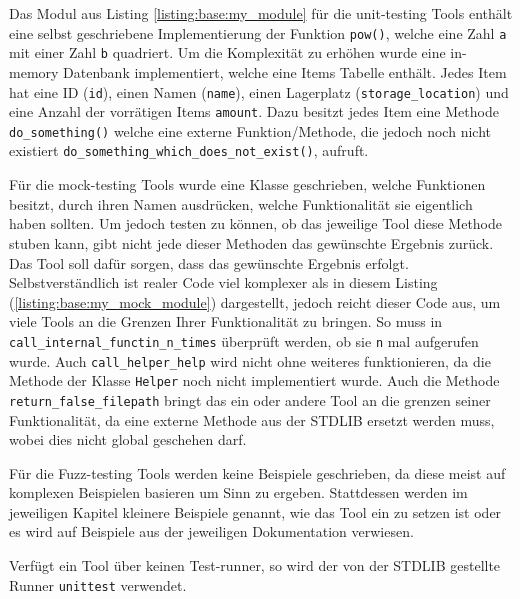 Das Modul aus Listing \ref{listing:base:my_module} für die unit-testing Tools
enthält eine selbst geschriebene Implementierung der Funktion \lstinline|pow()|,
welche eine Zahl \lstinline|a| mit einer Zahl \lstinline|b| quadriert. Um die
Komplexität zu erhöhen wurde eine in-memory Datenbank implementiert, welche
eine Items Tabelle enthält. Jedes Item hat eine ID (\lstinline|id|), einen Namen
(\lstinline|name|), einen Lagerplatz (\lstinline|storage_location|) und eine
Anzahl der vorrätigen Items \lstinline|amount|. Dazu besitzt jedes Item eine
Methode \lstinline|do_something()| welche eine externe Funktion/Methode,
die jedoch noch nicht existiert \lstinline|do_something_which_does_not_exist()|,
aufruft.

Für die \gls{mock}-testing Tools wurde eine Klasse geschrieben, welche 
Funktionen besitzt, durch ihren Namen ausdrücken, welche Funktionalität sie 
eigentlich haben sollten. Um jedoch testen zu können, ob das jeweilige Tool 
diese Methode \gls{stub}en kann, gibt nicht jede dieser Methoden das gewünschte 
Ergebnis zurück. Das Tool soll dafür sorgen, dass das gewünschte Ergebnis 
erfolgt. Selbstverständlich ist realer Code viel komplexer als in diesem Listing
(\ref{listing:base:my_mock_module}) dargestellt, jedoch reicht dieser Code aus,
um viele Tools an die Grenzen Ihrer Funktionalität zu bringen. So muss in
\lstinline{call_internal_functin_n_times} überprüft werden, ob sie \lstinline{n}
mal aufgerufen wurde. Auch \lstinline{call_helper_help} wird nicht ohne 
weiteres funktionieren, da die Methode der Klasse \lstinline{Helper} noch nicht 
implementiert wurde. Auch die Methode \lstinline{return_false_filepath}
bringt das ein oder andere Tool an die grenzen seiner Funktionalität, da eine 
externe Methode aus der STDLIB ersetzt werden muss, wobei dies nicht global 
geschehen darf.

Für die Fuzz-testing Tools werden keine Beispiele geschrieben, da diese meist 
auf komplexen Beispielen basieren um Sinn zu ergeben. Stattdessen werden im 
jeweiligen Kapitel kleinere Beispiele genannt, wie das Tool ein zu setzen ist 
oder es wird auf Beispiele aus der jeweiligen Dokumentation verwiesen.

Verfügt ein Tool über keinen Test-runner, so wird der von der STDLIB gestellte 
Runner \lstinline{unittest} verwendet.